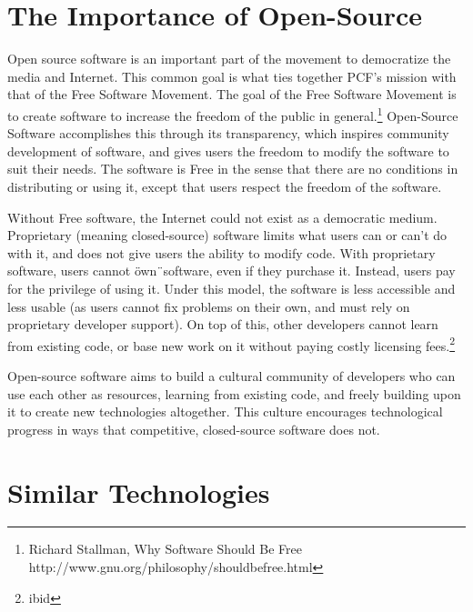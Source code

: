\documentclass[a4paper,12pt]{report}
\begin{document}
\section {The Importance of Open-Source}
Open source software is an important part of the movement to democratize the media and Internet. 
This common goal is what ties together PCF's mission with that of the Free Software Movement. 
The goal of the Free Software Movement is to create software to increase the freedom of the public in general.\footnote{Richard Stallman, Why Software Should Be Free http://www.gnu.org/philosophy/shouldbefree.html} 
Open-Source Software accomplishes this through its transparency, which inspires community development of software, and gives users the freedom to modify the software to suit their needs.
The software is Free in the sense that there are no conditions in distributing or using it, except that users respect the freedom of the software.


Without Free software, the Internet could not exist as a democratic medium.
Proprietary (meaning closed-source) software limits what users can or can't do with it, and does not give users the ability to modify code.
With proprietary software, users cannot \"own\"\ software, even if they purchase it.
Instead, users pay for the privilege of using it.
Under this model, the software is less accessible and less usable (as users cannot fix problems on their own, and must rely on proprietary developer support).
On top of this, other developers cannot learn from existing code, or base new work on it without paying costly licensing fees.\footnote{ibid} 


Open-source software aims to build a cultural community of developers who can use each other as resources, learning from existing code, and freely building upon it to create new technologies altogether.
This culture encourages technological progress in ways that competitive, closed-source software does not. 


\section {Similar Technologies}
\end{document}
